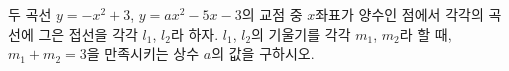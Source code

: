 두 곡선 $y=-x^2+3$, $y=ax^2-5x-3$의 교점 중 $x$좌표가 양수인 점에서 각각의 곡선에 그은 접선을 각각 $l_1$, $l_2$라 하자. $l_1$, $l_2$의 기울기를 각각 $m_1$, $m_2$라 할 때, $m_1+m_2=3$을 만족시키는 상수 $a$의 값을 구하시오.

